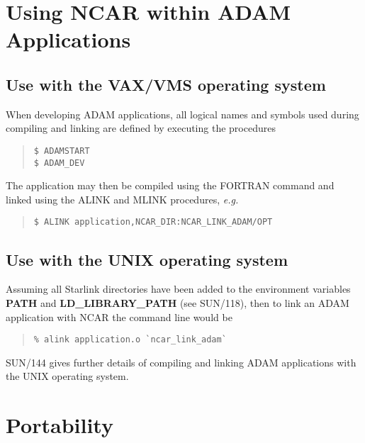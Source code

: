 \newpage

\section{Using NCAR within ADAM Applications} \label{adam_link}

\subsection{Use with the VAX/VMS operating system}

When developing ADAM applications, all logical names and symbols used 
during compiling and linking are defined by executing the procedures

\begin{quote}
\begin{verbatim}
$ ADAMSTART
$ ADAM_DEV
\end{verbatim}
\end{quote}

The application may then be compiled using the FORTRAN command and linked using
the ALINK and MLINK procedures, {\em e.g.}

\begin{quote}
\begin{verbatim}
$ ALINK application,NCAR_DIR:NCAR_LINK_ADAM/OPT
\end{verbatim}
\end{quote}


\subsection{Use with the UNIX operating system}

\begin{sloppypar}
Assuming all Starlink directories have been added to the environment variables
{\bf PATH} and {\bf LD\_LIBRARY\_PATH} (see SUN/118), then to link an ADAM
application with NCAR the command line would be
\end{sloppypar}

\begin{quote}
\begin{verbatim}
% alink application.o `ncar_link_adam`
\end{verbatim}
\end{quote}

SUN/144 gives further details of compiling and linking ADAM applications 
with the UNIX operating system.


\section {Portability}

